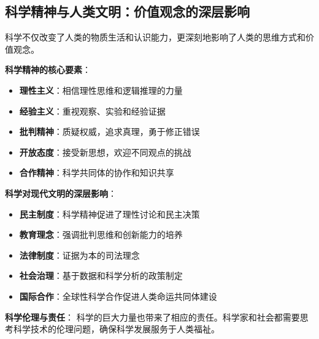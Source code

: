 \subsection{科学精神与人类文明：价值观念的深层影响}

\begin{theorembox}[title=科学精神的文明意义]
科学不仅改变了人类的物质生活和认识能力，更深刻地影响了人类的思维方式和价值观念。

\textbf{科学精神的核心要素}：
\begin{itemize}
\item \textbf{理性主义}：相信理性思维和逻辑推理的力量
\item \textbf{经验主义}：重视观察、实验和经验证据
\item \textbf{批判精神}：质疑权威，追求真理，勇于修正错误
\item \textbf{开放态度}：接受新思想，欢迎不同观点的挑战
\item \textbf{合作精神}：科学共同体的协作和知识共享
\end{itemize}

\textbf{科学对现代文明的深层影响}：
\begin{itemize}
\item \textbf{民主制度}：科学精神促进了理性讨论和民主决策
\item \textbf{教育理念}：强调批判思维和创新能力的培养
\item \textbf{法律制度}：证据为本的司法理念
\item \textbf{社会治理}：基于数据和科学分析的政策制定
\item \textbf{国际合作}：全球性科学合作促进人类命运共同体建设
\end{itemize}

\textbf{科学伦理与责任}：
科学的巨大力量也带来了相应的责任。科学家和社会都需要思考科学技术的伦理问题，确保科学发展服务于人类福祉。
\end{theorembox}

